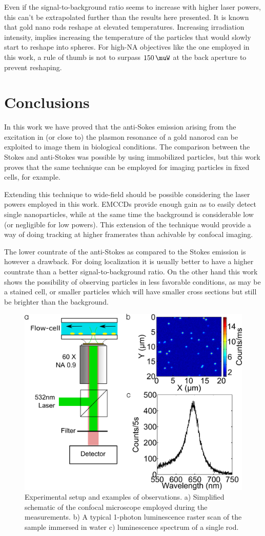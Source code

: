 \documentclass[journal=nalefd,manuscript=letter]{achemso}
\begin{document}
Even if the signal-to-background ratio seems to increase with higher laser
powers, this can't be extrapolated further than the results here presented.
It is known that gold nano rods reshape at elevated temperatures. Increasing
irradiation intensity, implies increasing the temperature of the particles
that would slowly start to reshape into spheres. For high-NA objectives like the
one employed in this work, a rule of thumb is not to surpass $150\,\muW$ at the
back aperture to prevent reshaping.

\section{Conclusions}
In this work we have proved that the anti-Sokes emission arising from the
excitation in (or close to) the plasmon resonance of a gold nanorod can be
exploited to image them in biological conditions. The comparison between the
Stokes and anti-Stokes was possible by using immobilized particles, but this
work proves that the same technique can be employed for imaging particles in
fixed cells, for example. 

Extending this technique to wide-field should be possible considering the
laser powers employed in this work. EMCCDs provide enough gain as to easily
detect single nanoparticles, while at the same time the background is considerable low
(or negligible for low powers). This extension of the technique would provide a
way of doing tracking at higher framerates than achivable by confocal imaging. 

The lower countrate of the anti-Stokes as compared to the Stokes emission is
however a drawback. For doing localization it is usually better to have a higher
countrate than a better signal-to-background ratio. On the other hand this work
shows the possibility of observing particles in less favorable conditions, as
may be a stained cell, or smaller particles which will have smaller cross
sections but still be brighter than the background.

\begin{figure}[p]
 \centering \includegraphics[width=0.45\linewidth]{Figures/01_Setup/setup_1.png}
 \caption{Experimental setup and examples of observations. a) Simplified
 schematic of the confocal microscope employed during the measurements. b) A
 typical 1-photon luminescence raster scan of the sample immersed in
 water c) luminescence spectrum of a single rod.}
 \label{fig:setup}
\end{figure}
\end{document}
